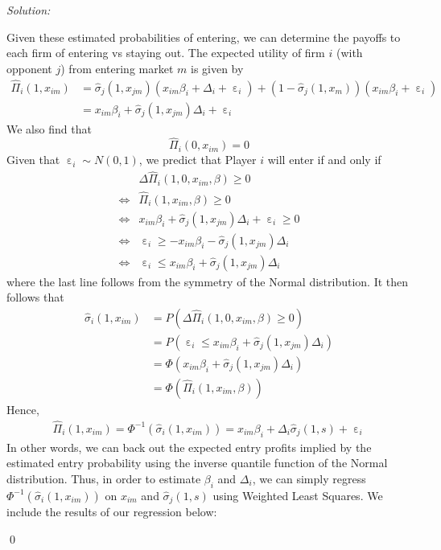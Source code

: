 \documentclass[12pt]{article}
\DeclareMathOperator{\eps}{\varepsilon}
\newenvironment{sol}
    {\emph{Solution:}
    }
    {
    \qed
    }
\begin{document}
\begin{sol}
  Given these estimated probabilities of entering, we can determine the payoffs to each firm of entering vs staying out. The expected utility of firm $i$ (with opponent $j$) from entering market $m$ is given by
  \begin{align*}\hat{\Pi}_{i}(1, x_{im}) &= \hat{\sigma}_{j}(1, x_{jm})(x_{im}\beta_i + \Delta_i + \eps_i) + (1-\hat{\sigma}_j(1, x_{m}))(x_{im}\beta_i + \eps_i)\\
    &= x_{im} \beta_i + \hat{\sigma}_j(1, x_{jm})\Delta_i + \eps_i
  \end{align*}
  We also find that 
  \[\hat{\Pi}_i(0, x_{im}) = 0\]
  Given that $\eps_i \sim N(0,1)$, we predict that Player $i$ will enter if and only if 
  \begin{align*}&\Delta \hat{\Pi}_i(1,0, x_{im}, \beta) \geq 0 \\\iff& \hat{\Pi}_i(1, x_{im}, \beta) \geq 0\\
    \iff &x_{im} \beta_i + \hat{\sigma}_j(1, x_{jm})\Delta_i + \eps_i \geq 0\\ \iff &\eps_i \geq -x_{im}\beta_i - \hat{\sigma}_j(1, x_{jm}) \Delta_i\\ \iff& \eps_i \leq x_{im}\beta_i + \hat{\sigma}_j(1, x_{jm}) \Delta_i
  \end{align*}
  where the last line follows from the symmetry of the Normal distribution. It then follows that
  \begin{align*}\hat{\sigma}_i(1, x_{im}) &= P(\Delta \hat{\Pi}_i(1,0, x_{im}, \beta) \geq 0)\\
    & = P( \eps_i \leq x_{im}\beta_i + \hat{\sigma}_j(1, x_{jm}) \Delta_i) \\
    &= \Phi(x_{im}\beta_i + \hat{\sigma}_j(1, x_{jm}) \Delta_i)\\& = \Phi(\hat{\Pi}_i(1, x_{im}, \beta))\end{align*}
  Hence,
  \begin{align*}\hat{\Pi}_i(1, x_{im}) = \Phi^{-1}(\hat{\sigma}_i(1, x_{im})) = x_{im} \beta_i + \Delta_i \hat{\sigma}_{j}(1,s) + \eps_i
  \end{align*}
  In other words, we can back out the expected entry profits implied by the estimated entry probability using the inverse quantile function of the Normal distribution. Thus, in order to estimate $\beta_i$ and $\Delta_i$, we can simply regress $\Phi^{-1}(\hat{\sigma}_i(1, x_{im}))$ on $x_{im}$ and $\hat{\sigma}_{j}(1,s)$ using Weighted Least Squares. We include the results of our regression below:
  \begin{table}[!htbp] \centering 

\end{table}
\end{sol}
\end{document}
